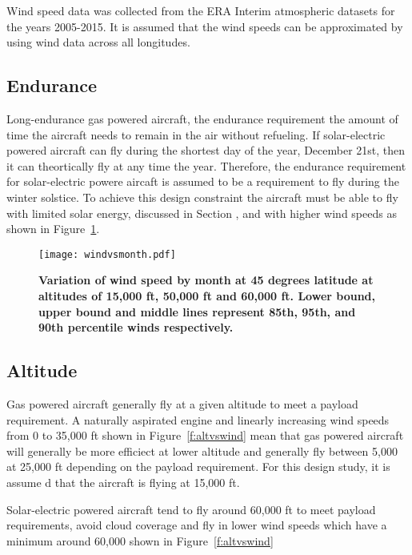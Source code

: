 \documentclass[]{aiaa-tc}%
\begin{document}
Wind speed data was collected from the ERA Interim atmospheric datasets for the years 2005-2015.\cite{wind} 
It is assumed that the wind speeds can be approximated by using wind data across all longitudes. 

\subsection{Endurance}

Long-endurance gas powered aircraft, the endurance requirement the amount of time the aircraft needs to remain in the air without refueling.  
If solar-electric powered aircraft can fly during the shortest day of the year, December 21st, then it can theortically fly at any time the year.  
Therefore, the endurance requirement for solar-electric powere aircaft is assumed to be a requirement to fly during the winter solstice.  
To achieve this design constraint the aircraft must be able to fly with limited solar energy, discussed in Section , and with higher wind speeds as shown in Figure~\ref{f:windvsmonth}.

\begin{figure}[H]
	\begin{center}
	\texttt{[image: windvsmonth.pdf]}
    \caption{\textbf{Variation of wind speed by month at 45 degrees latitude at altitudes of 15,000 ft, 50,000 ft and 60,000 ft.  Lower bound, upper bound and middle lines represent 85th, 95th, and 90th percentile winds respectively.}}
	\label{f:windvsmonth}
	\end{center}
\end{figure}

\subsection{Altitude}

Gas powered aircraft generally fly at a given altitude to meet a payload requirement.  
A naturally aspirated engine and linearly increasing wind speeds from 0 to 35,000 ft shown in Figure~\ref{f:altvswind} mean that gas powered aircraft will generally be more efficiect at lower altitude and generally fly between 5,000 at 25,000 ft depending on the payload requirement.  
For this design study, it is assume d that the aircraft is flying at 15,000 ft. 

Solar-electric powered aircraft tend to fly around 60,000 ft to meet payload requirements, avoid cloud coverage and fly in lower wind speeds which have a minimum around 60,000 shown in Figure~\ref{f:altvswind}
\end{document}
